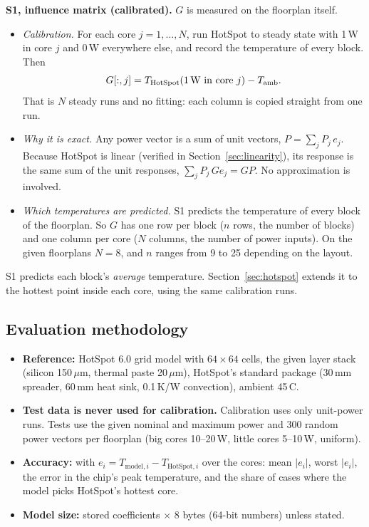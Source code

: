 \documentclass[11pt,a4paper]{article}
\newcommand{\degC}{\,\textdegree C}
\begin{document}
\textbf{S1, influence matrix (calibrated).} $G$ is measured on the floorplan itself.
\begin{itemize}
  \item \emph{Calibration.} For each core $j = 1,\dots,N$, run HotSpot to steady state with 1\,W
        in core $j$ and 0\,W everywhere else, and record the temperature of every block. Then
        \[ G[:,j] = T_\text{HotSpot}(\text{1\,W in core } j) - T_\text{amb}. \]
        That is $N$ steady runs and no fitting: each column is copied straight from one run.
  \item \emph{Why it is exact.} Any power vector is a sum of unit vectors,
        $P = \sum_j P_j\, e_j$. Because HotSpot is linear (verified in
        Section~\ref{sec:linearity}), its response is the same sum of the unit responses,
        $\sum_j P_j\, G e_j = G P$. No approximation is involved.
  \item \emph{Which temperatures are predicted.} S1 predicts the temperature of every block of
        the floorplan. So $G$ has one row per block ($n$ rows, the number of blocks) and one
        column per core ($N$ columns, the number of power inputs). On the given floorplans
        $N = 8$, and $n$ ranges from 9 to 25 depending on the layout.
\end{itemize}
S1 predicts each block's \emph{average} temperature. Section~\ref{sec:hotspot} extends it to the
hottest point inside each core, using the same calibration runs.

\subsection{Evaluation methodology}\label{sec:eval}
\begin{itemize}
  \item \textbf{Reference:} HotSpot 6.0 \cite{hotspot6} grid model with $64\times64$ cells, the
        given layer stack (silicon 150\,$\mu$m, thermal paste 20\,$\mu$m), HotSpot's standard
        package (30\,mm spreader, 60\,mm heat sink, 0.1\,K/W convection), ambient 45\degC.
  \item \textbf{Test data is never used for calibration.} Calibration uses only unit-power runs.
        Tests use the given nominal and maximum power and 300 random power vectors per floorplan
        (big cores 10--20\,W, little cores 5--10\,W, uniform).
  \item \textbf{Accuracy:} with $e_i = T_{\text{model},i} - T_{\text{HotSpot},i}$ over the cores:
        mean $|e_i|$, worst $|e_i|$, the error in the chip's peak temperature, and the share of
        cases where the model picks HotSpot's hottest core.
  \item \textbf{Model size:} stored coefficients $\times$ 8 bytes (64-bit numbers) unless stated.
\end{itemize}
\end{document}
